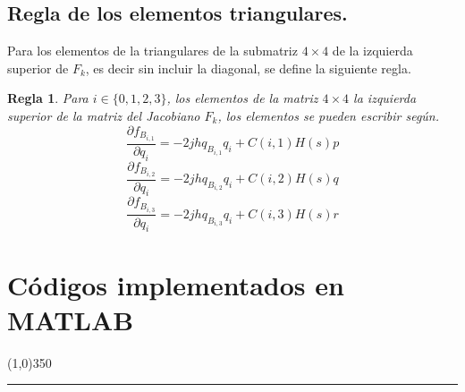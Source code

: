\documentclass[10pt]{report}
\numberwithin{equation}{chapter}
\numberwithin{algorithm}{chapter}
\newtheorem{regla}{Regla}[section]
\newcommand{\parderiv}[2]{\frac{\partial #1}{\partial #2}}
\begin{document}
\section{Regla de los elementos triangulares.}
Para los elementos de la triangulares de la submatriz $4\times4$ de la izquierda superior de $F_k$, es decir sin incluir la diagonal, se define la siguiente regla.
\begin{regla}
Para $i\in\{0,1,2,3\}$, los elementos de la matriz $4\times4$ la izquierda superior de la matriz del Jacobiano $F_k$, los elementos se pueden escribir según.
\begin{equation}
\parderiv{f_{B_{i,1}}}{q_i}=-2jhq_{B_{i,1}}q_i+C(i,1)H(s)p
\end{equation}
\begin{equation}
\parderiv{f_{B_{i,2}}}{q_i}=-2jhq_{B_{i,2}}q_i+C(i,2)H(s)q
\end{equation}
\begin{equation}
\parderiv{f_{B_{i,3}}}{q_i}=-2jhq_{B_{i,3}}q_i+C(i,3)H(s)r
\end{equation} 
\end{regla}
\chapter{Códigos implementados en MATLAB}\label{apen2}
\begin{center}
\line(1,0){350}\\\rule[-.4\baselineskip]{1.0\linewidth}{3.2pt}
\end{center}
\newpage
\end{document}
